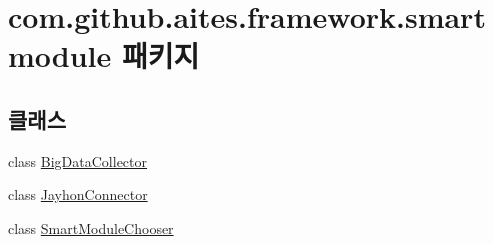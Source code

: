 \hypertarget{namespacecom_1_1github_1_1aites_1_1framework_1_1smartmodule}{}\section{com.\+github.\+aites.\+framework.\+smartmodule 패키지}
\label{namespacecom_1_1github_1_1aites_1_1framework_1_1smartmodule}
\subsection*{클래스}
\begin{DoxyCompactItemize}
\item 
class \mbox{\hyperlink{classcom_1_1github_1_1aites_1_1framework_1_1smartmodule_1_1_big_data_collector}{Big\+Data\+Collector}}
\item 
class \mbox{\hyperlink{classcom_1_1github_1_1aites_1_1framework_1_1smartmodule_1_1_jayhon_connector}{Jayhon\+Connector}}
\item 
class \mbox{\hyperlink{classcom_1_1github_1_1aites_1_1framework_1_1smartmodule_1_1_smart_module_chooser}{Smart\+Module\+Chooser}}
\end{DoxyCompactItemize}
